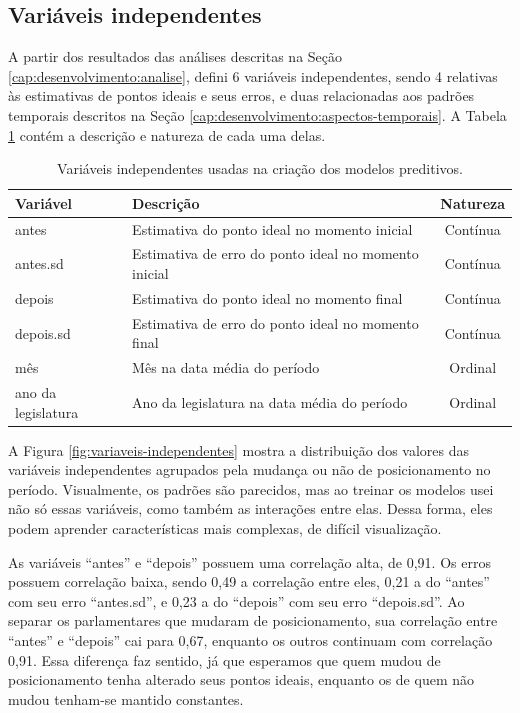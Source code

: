 \documentclass[a4paper,titlepage]{ppgi}\usepackage[]{graphicx}\usepackage[]{color}
\begin{document}
\subsection{Variáveis independentes}
\label{cap:desenvolvimento:variaveis-independentes}

A partir dos resultados das análises descritas na Seção
\ref{cap:desenvolvimento:analise}, defini 6 variáveis independentes, sendo 4 relativas
às estimativas de pontos ideais e seus erros, e duas relacionadas aos padrões
temporais descritos na Seção \ref{cap:desenvolvimento:aspectos-temporais}. A Tabela
\ref{table:variaveis-independentes} contém a descrição e natureza de cada uma
delas.

\begin{table}
\caption{Variáveis independentes usadas na criação dos modelos preditivos.}
\label{table:variaveis-independentes}
\centering
\begin{tabular}{l l c}
  Variável & Descrição & Natureza \\
  \hline
  antes & Estimativa do ponto ideal no momento inicial & Contínua \\
  antes.sd & Estimativa de erro do ponto ideal no momento inicial& Contínua \\
  depois & Estimativa do ponto ideal no momento final & Contínua \\
  depois.sd & Estimativa de erro do ponto ideal no momento final & Contínua \\
  mês & Mês na data média do período & Ordinal \\
  ano da legislatura & Ano da legislatura na data média do período & Ordinal \\
\end{tabular}
\end{table}

A Figura \ref{fig:variaveis-independentes} mostra a distribuição dos valores das
variáveis independentes agrupados pela mudança ou não de posicionamento no
período. Visualmente, os padrões são parecidos, mas ao treinar os modelos usei
não só essas variáveis, como também as interações entre elas. Dessa forma, eles
podem aprender características mais complexas, de difícil visualização.

As variáveis ``antes'' e ``depois'' possuem uma correlação alta, de
0,91. Os erros possuem correlação baixa, sendo
0,49 a correlação entre eles,
0,21 a do ``antes'' com seu erro
``antes.sd'', e 0,23 a do ``depois'' com seu
erro ``depois.sd''. Ao separar os parlamentares que mudaram de posicionamento,
sua correlação entre ``antes'' e ``depois'' cai para
0,67, enquanto os outros continuam com
correlação 0,91. Essa diferença faz sentido, já
que esperamos que quem mudou de posicionamento tenha alterado seus pontos
ideais, enquanto os de quem não mudou tenham-se mantido constantes.
\end{document}
